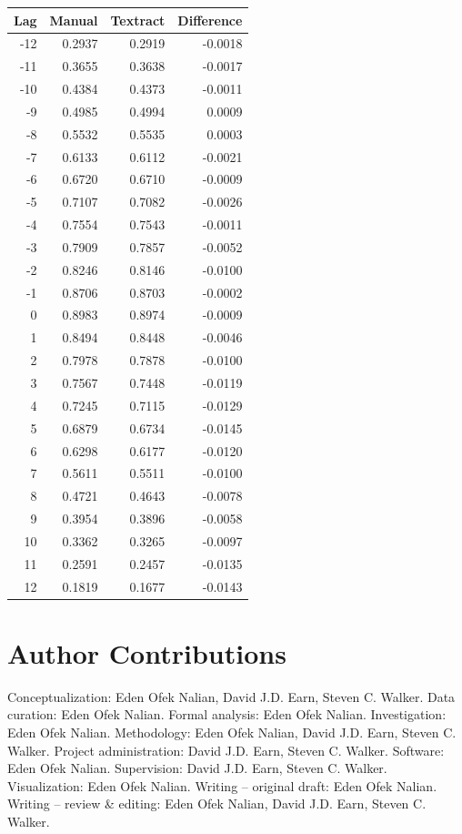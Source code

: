 \documentclass[12pt]{article}
\begin{document}
\begin{table}[h]
\centering
\begin{tabular}{rrrr}
\toprule
Lag & Manual & Textract & Difference \\
\midrule
-12 & 0.2937 & 0.2919 & -0.0018 \\
-11 & 0.3655 & 0.3638 & -0.0017 \\
-10 & 0.4384 & 0.4373 & -0.0011 \\
 -9 & 0.4985 & 0.4994 & 0.0009 \\
 -8 & 0.5532 & 0.5535 & 0.0003 \\
 -7 & 0.6133 & 0.6112 & -0.0021 \\
 -6 & 0.6720 & 0.6710 & -0.0009 \\
 -5 & 0.7107 & 0.7082 & -0.0026 \\
 -4 & 0.7554 & 0.7543 & -0.0011 \\
 -3 & 0.7909 & 0.7857 & -0.0052 \\
 -2 & 0.8246 & 0.8146 & -0.0100 \\
 -1 & 0.8706 & 0.8703 & -0.0002 \\
  0 & 0.8983 & 0.8974 & -0.0009 \\
  1 & 0.8494 & 0.8448 & -0.0046 \\
  2 & 0.7978 & 0.7878 & -0.0100 \\
  3 & 0.7567 & 0.7448 & -0.0119 \\
  4 & 0.7245 & 0.7115 & -0.0129 \\
  5 & 0.6879 & 0.6734 & -0.0145 \\
  6 & 0.6298 & 0.6177 & -0.0120 \\
  7 & 0.5611 & 0.5511 & -0.0100 \\
  8 & 0.4721 & 0.4643 & -0.0078 \\
  9 & 0.3954 & 0.3896 & -0.0058 \\
 10 & 0.3362 & 0.3265 & -0.0097 \\
 11 & 0.2591 & 0.2457 & -0.0135 \\
 12 & 0.1819 & 0.1677 & -0.0143 \\
\bottomrule
\end{tabular}
\end{table}




\section*{Author Contributions}
Conceptualization: Eden Ofek Nalian, David J.D. Earn, Steven C. Walker.
Data curation: Eden Ofek Nalian.
Formal analysis: Eden Ofek Nalian.
Investigation: Eden Ofek Nalian.
Methodology: Eden Ofek Nalian, David J.D. Earn, Steven C. Walker.
Project administration: David J.D. Earn, Steven C. Walker.
Software: Eden Ofek Nalian.
Supervision: David J.D. Earn, Steven C. Walker.
Visualization: Eden Ofek Nalian.
Writing -- original draft: Eden Ofek Nalian.
Writing -- review \& editing: Eden Ofek Nalian, David J.D. Earn, Steven C. Walker.
\end{document}
